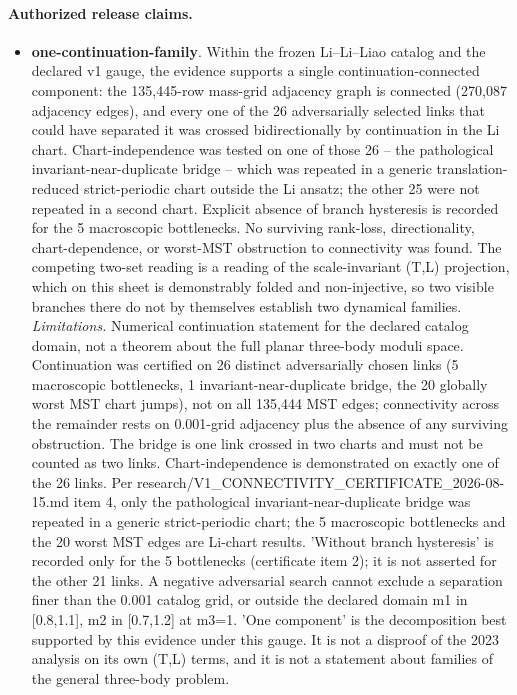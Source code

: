 \paragraph{Authorized release claims.}
\begin{itemize}
\item \textbf{one-continuation-family}. Within the frozen Li--Li--Liao catalog and the declared v1 gauge, the evidence supports a single continuation-connected component: the 135,445-row mass-grid adjacency graph is connected (270,087 adjacency edges), and every one of the 26 adversarially selected links that could have separated it was crossed bidirectionally by continuation in the Li chart. Chart-independence was tested on one of those 26 -- the pathological invariant-near-duplicate bridge -- which was repeated in a generic translation-reduced strict-periodic chart outside the Li ansatz; the other 25 were not repeated in a second chart. Explicit absence of branch hysteresis is recorded for the 5 macroscopic bottlenecks. No surviving rank-loss, directionality, chart-dependence, or worst-MST obstruction to connectivity was found. The competing two-set reading is a reading of the scale-invariant (T,L) projection, which on this sheet is demonstrably folded and non-injective, so two visible branches there do not by themselves establish two dynamical families. \emph{Limitations.} Numerical continuation statement for the declared catalog domain, not a theorem about the full planar three-body moduli space. Continuation was certified on 26 distinct adversarially chosen links (5 macroscopic bottlenecks, 1 invariant-near-duplicate bridge, the 20 globally worst MST chart jumps), not on all 135,444 MST edges; connectivity across the remainder rests on 0.001-grid adjacency plus the absence of any surviving obstruction. The bridge is one link crossed in two charts and must not be counted as two links. Chart-independence is demonstrated on exactly one of the 26 links. Per research/V1\_CONNECTIVITY\_CERTIFICATE\_2026-08-15.md item 4, only the pathological invariant-near-duplicate bridge was repeated in a generic strict-periodic chart; the 5 macroscopic bottlenecks and the 20 worst MST edges are Li-chart results. 'Without branch hysteresis' is recorded only for the 5 bottlenecks (certificate item 2); it is not asserted for the other 21 links. A negative adversarial search cannot exclude a separation finer than the 0.001 catalog grid, or outside the declared domain m1 in [0.8,1.1], m2 in [0.7,1.2] at m3=1. 'One component' is the decomposition best supported by this evidence under this gauge. It is not a disproof of the 2023 analysis on its own (T,L) terms, and it is not a statement about families of the general three-body problem.

\end{itemize}
